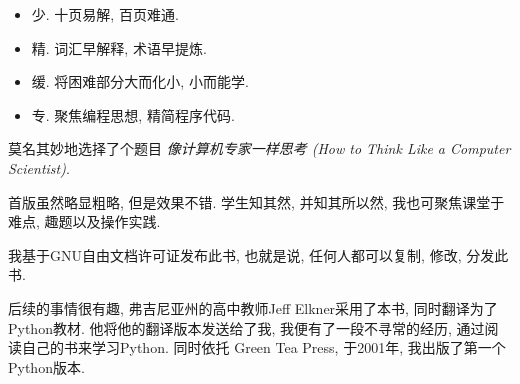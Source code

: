 \documentclass[10pt]{book}
\begin{document}
\begin{itemize}

%
%
%
\item 少. 十页易解, 百页难通.

\item 精. 词汇早解释, 术语早提炼.

\item 缓. 将困难部分大而化小, 小而能学.

\item 专. 聚焦编程思想, 精简程序代码.

\end{itemize}

%
%
莫名其妙地选择了个题目 {\em 像计算机专家一样思考
(How to Think Like a Computer Scientist)}.

首版虽然略显粗略, 但是效果不错. 
学生知其然, 并知其所以然, 我也可聚焦课堂于难点, 趣题以及操作实践. 

我基于GNU自由文档许可证发布此书, 
也就是说, 任何人都可以复制, 修改, 分发此书. 

后续的事情很有趣, 弗吉尼亚州的高中教师Jeff Elkner采用了本书, 
同时翻译为了Python教材. 他将他的翻译版本发送给了我, 
我便有了一段不寻常的经历, 通过阅读自己的书来学习Python.  
同时依托 Green Tea Press, 于2001年, 我出版了第一个Python版本. 
\end{document}
